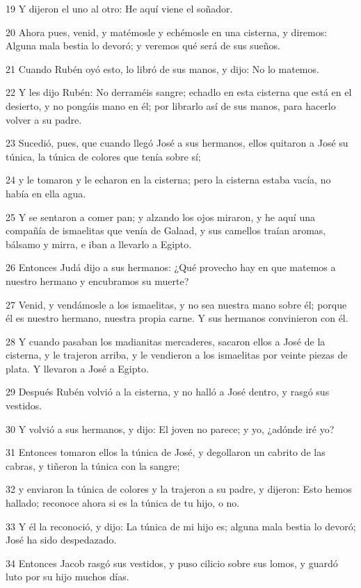 19 Y dijeron el uno al otro: He aquí viene el soñador.

20 Ahora pues, venid, y matémosle y echémosle en una cisterna, y diremos: Alguna mala bestia lo devoró; y veremos qué será de sus sueños.

21 Cuando Rubén oyó esto, lo libró de sus manos, y dijo: No lo matemos.

22 Y les dijo Rubén: No derraméis sangre; echadlo en esta cisterna que está en el desierto, y no pongáis mano en él; por librarlo así de sus manos, para hacerlo volver a su padre.

23 Sucedió, pues, que cuando llegó José a sus hermanos, ellos quitaron a José su túnica, la túnica de colores que tenía sobre sí;

24 y le tomaron y le echaron en la cisterna; pero la cisterna estaba vacía, no había en ella agua.

25 Y se sentaron a comer pan; y alzando los ojos miraron, y he aquí una compañía de ismaelitas que venía de Galaad, y sus camellos traían aromas, bálsamo y mirra, e iban a llevarlo a Egipto.

26 Entonces Judá dijo a sus hermanos: ¿Qué provecho hay en que matemos a nuestro hermano y encubramos su muerte?

27 Venid, y vendámosle a los ismaelitas, y no sea nuestra mano sobre él; porque él es nuestro hermano, nuestra propia carne. Y sus hermanos convinieron con él.

28 Y cuando pasaban los madianitas mercaderes, sacaron ellos a José de la cisterna, y le trajeron arriba, y le vendieron a los ismaelitas por veinte piezas de plata. Y llevaron a José a Egipto.

29 Después Rubén volvió a la cisterna, y no halló a José dentro, y rasgó sus vestidos.

30 Y volvió a sus hermanos, y dijo: El joven no parece; y yo, ¿adónde iré yo?

31 Entonces tomaron ellos la túnica de José, y degollaron un cabrito de las cabras, y tiñeron la túnica con la sangre;

32 y enviaron la túnica de colores y la trajeron a su padre, y dijeron: Esto hemos hallado; reconoce ahora si es la túnica de tu hijo, o no.

33 Y él la reconoció, y dijo: La túnica de mi hijo es; alguna mala bestia lo devoró; José ha sido despedazado.

34 Entonces Jacob rasgó sus vestidos, y puso cilicio sobre sus lomos, y guardó luto por su hijo muchos días.

